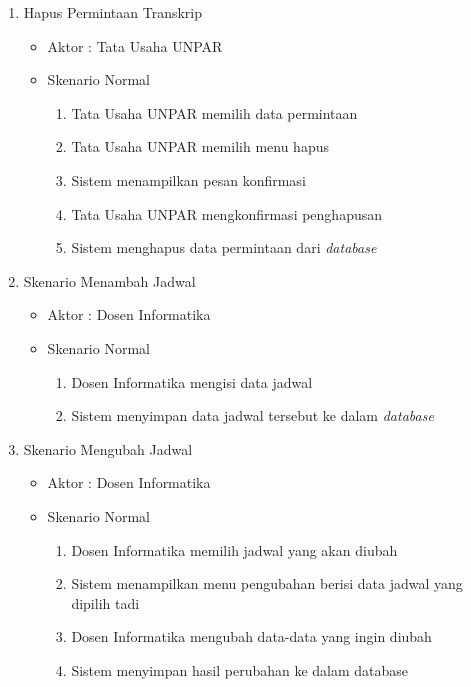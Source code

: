 \begin{enumerate}
	\item Hapus Permintaan Transkrip
	\begin{itemize}
		\item Aktor : Tata Usaha UNPAR
		\item Skenario Normal
			\begin{enumerate}[1.]
				\item Tata Usaha UNPAR memilih data permintaan
				\item Tata Usaha UNPAR memilih menu hapus
				\item Sistem menampilkan pesan konfirmasi
				\item Tata Usaha UNPAR mengkonfirmasi penghapusan
				\item Sistem menghapus data permintaan dari \textit{database}
			\end{enumerate}
	\end{itemize}

	\item Skenario Menambah Jadwal
	\begin{itemize}
		\item Aktor : Dosen Informatika
		\item Skenario Normal
			\begin{enumerate}[1.]
				\item Dosen Informatika mengisi data jadwal
				\item Sistem menyimpan data jadwal tersebut ke dalam \textit{database}
			\end{enumerate}
	\end{itemize}

	\item Skenario Mengubah Jadwal
	\begin{itemize}
		\item Aktor : Dosen Informatika
		\item Skenario Normal
			\begin{enumerate}[1.]
				\item Dosen Informatika memilih jadwal yang akan diubah
				\item Sistem menampilkan menu pengubahan berisi data jadwal yang dipilih tadi
				\item Dosen Informatika mengubah data-data yang ingin diubah
				\item Sistem menyimpan hasil perubahan ke dalam database
			\end{enumerate}
	\end{itemize}



\end{enumerate}
